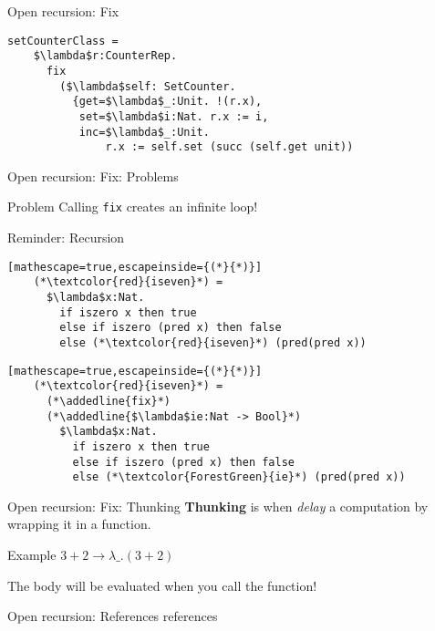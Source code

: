\documentclass[presentation,xcolor=svgnames]{beamer}
\begin{document}
\begin{frame}[fragile]{Open recursion: Fix}
  \begin{lstlisting}[mathescape=true]
    setCounterClass =
    $\lambda$r:CounterRep.
      fix
        ($\lambda$self: SetCounter.
          {get=$\lambda$_:Unit. !(r.x),
           set=$\lambda$i:Nat. r.x := i,
           inc=$\lambda$_:Unit.
               r.x := self.set (succ (self.get unit))
  \end{lstlisting}
\end{frame}

\begin{frame}[fragile]{Open recursion: Fix: Problems}
  \begin{block}{Problem}
    Calling \texttt{fix} creates an infinite loop!
  \end{block}
\end{frame}

\begin{frame}[fragile]{Reminder: Recursion}
  \begin{lstlisting}[mathescape=true,escapeinside={(*}{*)}]
    (*\textcolor{red}{iseven}*) =
      $\lambda$x:Nat.
        if iszero x then true
        else if iszero (pred x) then false
        else (*\textcolor{red}{iseven}*) (pred(pred x))
  \end{lstlisting}
  \begin{lstlisting}[mathescape=true,escapeinside={(*}{*)}]
    (*\textcolor{red}{iseven}*) =
      (*\addedline{fix}*)
      (*\addedline{$\lambda$ie:Nat -> Bool}*)
        $\lambda$x:Nat.
          if iszero x then true
          else if iszero (pred x) then false
          else (*\textcolor{ForestGreen}{ie}*) (pred(pred x))
  \end{lstlisting}
\end{frame}

\begin{frame}[fragile]{Open recursion: Fix: Thunking}
  \textbf{Thunking} is when \emph{delay} a computation by wrapping it in a function.

  \begin{block}{Example}
    $3 + 2 \rightarrow \lambda \_. (3 + 2)$
  \end{block}

  The body will be evaluated when you call the function!
\end{frame}

\begin{frame}[fragile]{Open recursion: References}
references
\end{frame}
\end{document}
